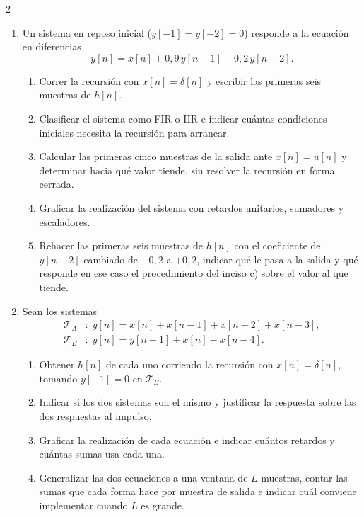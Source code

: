 \documentclass[10pt,a4paper]{article}
\begin{document}
\begin{multicols}{2}
\begin{enumerate}
		\item Un sistema en reposo inicial ($y[-1]=y[-2]=0$) responde a la
		ecuación en diferencias
		\[
			y[n] = x[n] + 0{,}9\,y[n-1] - 0{,}2\,y[n-2].
		\]
		\begin{enumerate}
			\item Correr la recursión con $x[n]=\delta[n]$ y escribir las
			primeras seis muestras de $h[n]$.
			\item Clasificar el sistema como FIR o IIR e indicar cuántas
			condiciones iniciales necesita la recursión para arrancar.
			\item Calcular las primeras cinco muestras de la salida ante
			$x[n]=u[n]$ y determinar hacia qué valor tiende, sin resolver la
			recursión en forma cerrada.
			\item Graficar la realización del sistema con retardos unitarios,
			sumadores y escaladores.
			\item Rehacer las primeras seis muestras de $h[n]$ con el
			coeficiente de $y[n-2]$ cambiado de $-0{,}2$ a $+0{,}2$, indicar
			qué le pasa a la salida y qué responde en ese caso el
			procedimiento del inciso c) sobre el valor al que tiende.
		\end{enumerate}

		\item Sean los sistemas
		\begin{align*}
			\mathcal{T}_A&: \; y[n] = x[n]+x[n-1]+x[n-2]+x[n-3], \\
			\mathcal{T}_B&: \; y[n] = y[n-1] + x[n] - x[n-4].
		\end{align*}
		\begin{enumerate}
			\item Obtener $h[n]$ de cada uno corriendo la recursión con
			$x[n]=\delta[n]$, tomando $y[-1]=0$ en $\mathcal{T}_B$.
			\item Indicar si los dos sistemas son el mismo y justificar la
			respuesta sobre las dos respuestas al impulso.
			\item Graficar la realización de cada ecuación e indicar cuántos
			retardos y cuántas sumas usa cada una.
			\item Generalizar las dos ecuaciones a una ventana de $L$
			muestras, contar las sumas que cada forma hace por muestra de
			salida e indicar cuál conviene implementar cuando $L$ es grande.
		\end{enumerate}

		\end{enumerate}

	\end{multicols}
\end{document}
